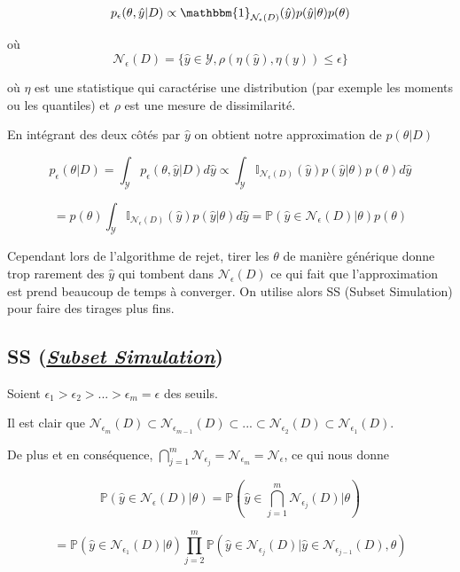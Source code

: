 \documentclass[french,12pt]{article}
\begin{document}
$$p_{\epsilon} (\theta , \hat{y} | D) \propto \mathbbm{1}_{\mathcal{N}_{\epsilon}(D)} (\hat{y}) p(\hat{y} | \theta)
    p(\theta) $$

où $$\mathcal{N}_{\epsilon}(D) = \{\hat{y} \in \mathcal{Y}, \rho(\eta(\hat{y}), \eta(y)) \leq \epsilon\}$$


où $\eta$ est une statistique qui caractérise une distribution
(par exemple les moments ou les quantiles) et $\rho$ est une mesure de dissimilarité.

En intégrant des deux côtés par $\hat{y}$ on obtient notre approximation de $p(\theta | D)$

$$p_{\epsilon}( \theta | D) = \int_{\mathcal{Y}} p_{\epsilon}( \theta , \hat{y}| D) d \hat{y} \propto \int_{\mathcal{Y}} \mathbb{I}_{\mathcal{N}_\epsilon (D)} (\hat{y}) p( \hat{y}| \theta) p( \theta) d \hat{y}$$

$$ = p( \theta) \int_{\mathcal{Y}} \mathbb{I}_{\mathcal{N}_\epsilon (D)} (\hat{y})  p( \hat{y}| \theta) d \hat{y} = \mathbb{P} (\hat{y} \in \mathcal{N}_{\epsilon} (D)| \theta) p( \theta)$$

Cependant lors de l'algorithme de rejet, tirer les $\theta$ de manière générique donne trop rarement des $\hat{y}$ qui tombent dans $\mathcal{N}_{\epsilon} (D)$
ce qui fait que l'approximation est prend beaucoup de temps à converger. On utilise alors SS (Subset Simulation)
pour faire des tirages plus fins.

\subsection{SS (\href{https://en.wikipedia.org/wiki/Subset_simulation}{\textit{Subset Simulation}})}

Soient $\epsilon_1 > \epsilon_2 > ... >\epsilon_m = \epsilon$ des seuils.

Il est clair que $\mathcal{N}_{\epsilon_m} (D)\subset \mathcal{N}_{\epsilon_{m - 1}} (D)
    \subset ... \subset \mathcal{N}_{\epsilon_{2}} (D) \subset \mathcal{N}_{\epsilon_{1}} (D)$.

De plus et en conséquence, $\bigcap_{j = 1}^m \mathcal{N}_{\epsilon_j} = \mathcal{N}_{\epsilon_m} = \mathcal{N}_{\epsilon} $, ce qui nous donne

$$ \mathbb{P} \left(\hat{y} \in \mathcal{N}_{\epsilon} (D)| \theta \right) = \mathbb{P} \left(\hat{y} \in \bigcap_{j = 1}^m \mathcal{N}_{\epsilon_j} (D)| \theta\right)$$

$$= \mathbb{P} \left(\hat{y} \in \mathcal{N}_{\epsilon_1} (D)| \theta\right)
    \prod_{j = 2}^{m} \mathbb{P} \left(\hat{y} \in \mathcal{N}_{\epsilon_j} (D)|\hat{y} \in \mathcal{N}_{\epsilon_{j - 1}} (D), \theta\right)$$
\end{document}
